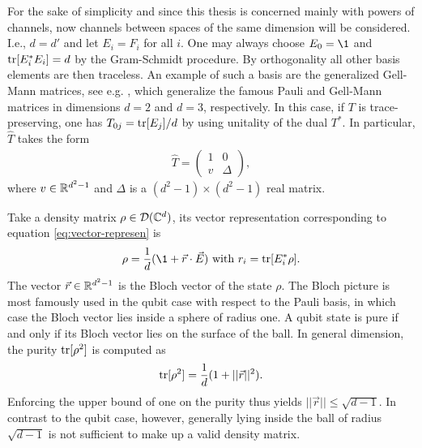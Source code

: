 For the sake of simplicity and since this thesis is concerned mainly with powers of channels, now channels between spaces of the same dimension will be considered. I.e., $d=d'$ and let $E_i = F_i$ for all $i$. One may always choose $E_0 = \1$ and $\mathrm{tr}[E_i^*E_i] = d$ by the Gram-Schmidt procedure. By orthogonality all other basis elements are then traceless. An example of such a basis are the generalized Gell-Mann matrices, see e.g. \cite{Kimura2003}, which generalize the famous Pauli and Gell-Mann matrices in dimensions $d=2$ and $d=3$, respectively. In this case, if $T$ is trace-preserving, one has $
    T_{0j}=\mathrm{tr}[E_j]/d$ by using unitality of the dual $T^*$. In particular, $\hat T$ takes the form
    \begin{align}\label{eq:natural-matrix-rep}
        \hat T = \begin{pmatrix}
            1 & 0 \\
            v & \Delta
        \end{pmatrix},
    \end{align}
where $v \in \mathbb{R}^{d^2-1}$ and $\Delta$ is a $(d^2-1)\times (d^2-1)$ real matrix. 


Take a density matrix $\rho \in \mathcal D(\mathbb{C}^d)$, its vector representation corresponding to equation \eqref{eq:vector-represen} is
\begin{align}
    \rho = \frac{1}{d}(\1+\vec r \cdot \vec E) \text{ with }r_i =\tr[E_i^*\rho].
\end{align}
The vector $\vec r \in \mathbb{R}^{d^2-1}$ is the Bloch vector of the state $\rho$. The Bloch picture is most famously used in the qubit case with respect to the Pauli basis, in which case the Bloch vector lies inside a sphere of radius one. A qubit state is pure if and only if its Bloch vector lies on the surface of the ball. In general dimension, the purity $\mathrm{tr}[\rho^2]$ is computed as 
\begin{align}
    \mathrm{tr}[\rho^2] = \frac{1}{d}(1+\vert \vert \vec r\vert \vert ^2).
\end{align}
Enforcing the upper bound of one on the purity thus yields $\vert \vert \vec r\vert \vert \leq \sqrt{d-1}$. In contrast to the qubit case, however, generally lying inside the ball of radius $\sqrt{d-1}$ is not sufficient to make up a valid density matrix.

